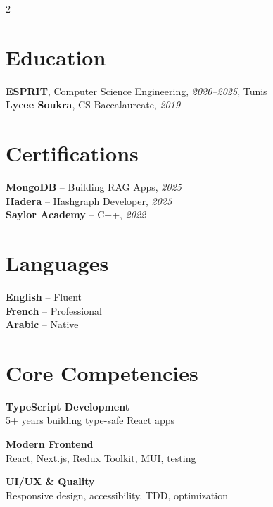 \documentclass[10pt,a4paper]{article}
\begin{document}
\vspace{6pt}
\begin{multicols}{2}

\section*{Education}
{\small
\textbf{ESPRIT}, Computer Science Engineering, \textit{2020--2025}, Tunis\\[1pt]
\textbf{Lycee Soukra}, CS Baccalaureate, \textit{2019}
}

\vspace{3pt}
\section*{Certifications}
{\small
\textbf{MongoDB} -- Building RAG Apps, \textit{2025}\\[1pt]
\textbf{Hadera} -- Hashgraph Developer, \textit{2025}\\[1pt]
\textbf{Saylor Academy} -- C++, \textit{2022}
}

\columnbreak

\section*{Languages}
{\small
\textbf{English} -- Fluent\\[1pt]
\textbf{French} -- Professional\\[1pt]
\textbf{Arabic} -- Native
}

\vspace{3pt}
\section*{Core Competencies}
{\small
\textbf{TypeScript Development}\\[1pt]
5+ years building type-safe React apps

\vspace{4pt}
\textbf{Modern Frontend}\\[1pt]
React, Next.js, Redux Toolkit, MUI, testing

\vspace{4pt}
\textbf{UI/UX \& Quality}\\[1pt]
Responsive design, accessibility, TDD, optimization
}

\end{multicols}
\end{document}
